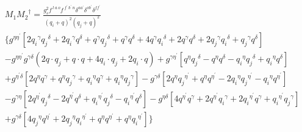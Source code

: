 \begin{equation}
\begin{split}
&M_1{M_2}^{\dagger}=\frac{g_s^2 f^{\:l\:a\:o} f^{\:f^{\prime}\: b^{\prime}\:n} \delta^{aa^{\prime}} \delta^{ob^{\prime}} \delta^{ff^{\prime}}}{(q_i +q)^2 (q_j +q)^2}\\
&\lbrace g^{{{\eta}}{{\eta}^{\prime}}}[2{q_i}^{{\gamma}}{q_j}^{\delta}+2{q_i}^{{\gamma}}{q}^{\delta}+{q}^{{\gamma}}{q_j}^{\delta}+{q}^{{\gamma}}{q}^{\delta}+4q^{{\gamma}}{q_i}^{\delta}+2q^{{\gamma}}{q}^{\delta}+2{q_j}^{{\gamma}}{q_i}^{\delta}+{q_j}^{{\gamma}}{q}^{\delta}]\\
&-g^{{{\eta}}{{\eta}^{\prime}}}g^{{{\gamma}}{{\delta}}}(2q\cdot q_j+ q\cdot q+4q_i \cdot q_j+2q_i \cdot q)+g^{{{\gamma}}{{\eta}^{\prime}}}[{q}^{{\eta}}{q_j}^{\delta}-{q}^{{\eta}}{q}^{\delta}-{q_i}^{{\eta}}{q_j}^{\delta}+{q_i}^{{\eta}}{q}^{\delta}]\\
&+g^{{{\eta}^{\prime}}{{\delta}}}[2{q}^{{\eta}}{q}^{\gamma}+{q}^{{\eta}}{q_j}^{\gamma}+{q_i}^{{\eta}}{q}^{\gamma}+{q_i}^{{\eta}}{q_j}^{\gamma}]-g^{{{\gamma}}{{\delta}}}[2{q}^{\eta}{q_j}^{{\eta}^{\prime}}+{q}^{\eta}{q}^{{\eta}^{\prime}}-2{q_i}^{\eta}{q_j}^{{\eta}^{\prime}}-{q_i}^{\eta}{q}^{{\eta}^{\prime}}]\\
&-g^{{{\gamma}}{{\eta}}}[2{q}^{{\eta}^{\prime}}{q_j}^{{\delta}}-{2q}^{{\eta}^{\prime}}{q}^{{\delta}}+{q_i}^{{\eta}^{\prime}}{q_j}^{{\delta}}-{q_i}^{{\eta}^{\prime}}{q}^{{\delta}}]-g^{{{\eta}}{{\delta}}}[4{q}^{{\eta}^{\prime}}{q}^{{\gamma}}+2{q}^{{\eta}^{\prime}}{q_i}^{{\gamma}}+2{q_i}^{{\eta}^{\prime}}{q}^{{\gamma}}+{q_i}^{{\eta}^{\prime}}{q_j}^{{\gamma}}]\\
&+g^{{{\gamma}}{{\delta}}}[4{q_j}^{{\eta}}{q}^{{\eta}^{\prime}}+2{q_j}^{{\eta}}{q_i}^{{\eta}^{\prime}}+{q}^{{\eta}}{q}^{{\eta}^{\prime}}+{q}^{{\eta}}{q_i}^{{\eta}^{\prime}}]\rbrace
\end{split}
\end{equation}



